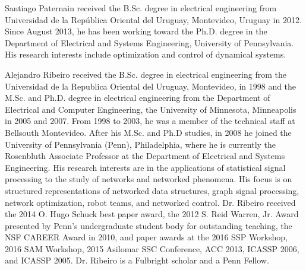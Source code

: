 \documentclass[article]{IEEEtran}
\theoremstyle{definition}
\begin{document}
%
\begin{IEEEbiography}[]{Santiago Paternain}  
received the B.Sc. degree in electrical engineering from Universidad de la Rep\'ublica Oriental del Uruguay, Montevideo, Uruguay in 2012. Since August 2013, he has been working toward the Ph.D. degree in the Department of Electrical and Systems Engineering, University of Pennsylvania. His research interests include optimization and control of dynamical systems. 
\end{IEEEbiography}
\begin{IEEEbiography}[]{Alejandro Ribeiro}
received the B.Sc. degree in electrical engineering from the Universidad de la Republica Oriental del Uruguay, Montevideo, in 1998 and the M.Sc. and Ph.D. degree in electrical engineering from the Department of Electrical and Computer Engineering, the University of Minnesota, Minneapolis in 2005 and 2007. From 1998 to 2003, he was a member of the technical staff at Bellsouth Montevideo. After his M.Sc. and Ph.D studies, in 2008 he joined the University of Pennsylvania (Penn), Philadelphia, where he is currently the Rosenbluth Associate Professor at the Department of Electrical and Systems Engineering. His research interests are in the applications of statistical signal processing to the study of networks and networked phenomena. His focus is on structured representations of networked data structures, graph signal processing, network optimization, robot teams, and networked control. Dr. Ribeiro received the 2014 O. Hugo Schuck best paper award, the 2012 S. Reid Warren, Jr. Award presented by Penn's undergraduate student body for outstanding teaching, the NSF CAREER Award in 2010, and paper awards at the 2016 SSP Workshop, 2016 SAM Workshop, 2015 Asilomar SSC Conference, ACC 2013, ICASSP 2006, and ICASSP 2005. Dr. Ribeiro is a Fulbright scholar and a Penn Fellow.
\end{IEEEbiography}
\end{document}
